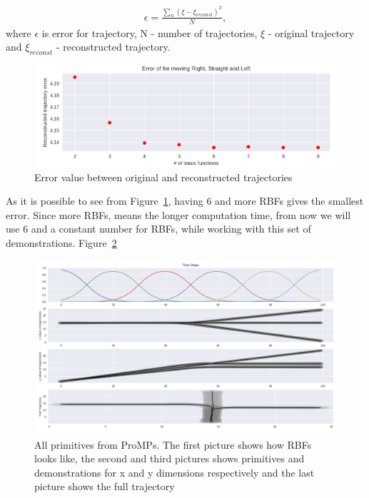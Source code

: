 \begin{equation}
\begin{split}
\epsilon = \frac{\sum_{n}(\xi - \xi_{reconst})^2}{N}, 
\end{split}
\label{eqn:1234}
\end{equation}
where $\epsilon$ is error for trajectory, N - number of trajectories, $\xi$ - original trajectory and $\xi_{reconst}$ - reconstructed trajectory.

\begin{figure}[H]
	\centering  	
	\includegraphics[width=13cm]{img/org_error.png}
	\caption{Error value between original and reconstructed trajectories}
	\label{fig:orgError}    
\end{figure}

As it is possible to see from Figure~\ref{fig:orgError}, having $6$ and more \glspl{RBF} gives the smallest error. Since more \glspl{RBF}, means the longer computation time, from now we will use $6$ and a constant number for \glspl{RBF}, while working with this set of demonstrations. Figure~\ref{fig:primitives}

\begin{figure}[H]
	\centering  	
	\includegraphics[width=17cm]{img/primitives.png}
	\caption{All primitives from \gls{ProMPs}. The first picture shows how \glspl{RBF} looks like, the second and third pictures shows primitives and demonstrations for x and y dimensions respectively and the last picture shows the full trajectory}
	\label{fig:primitives}    
\end{figure}